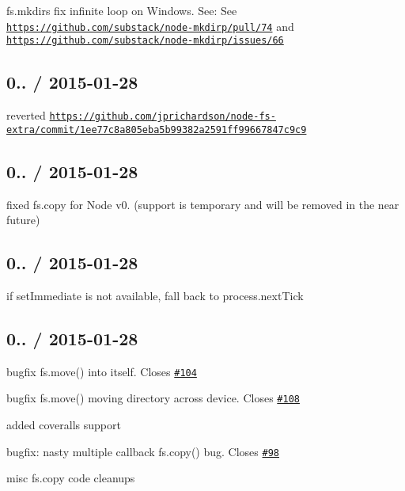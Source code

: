 \begin{DoxyItemize}
\item {\ttfamily fs.\+mkdirs} fix infinite loop on Windows. See\+: See \href{https://github.com/substack/node-mkdirp/pull/74}{\tt https\+://github.\+com/substack/node-\/mkdirp/pull/74} and \href{https://github.com/substack/node-mkdirp/issues/66}{\tt https\+://github.\+com/substack/node-\/mkdirp/issues/66}
\end{DoxyItemize}

\subsection*{0.. / 2015-\/01-\/28 }


\begin{DoxyItemize}
\item reverted \href{https://github.com/jprichardson/node-fs-extra/commit/1ee77c8a805eba5b99382a2591ff99667847c9c9}{\tt https\+://github.\+com/jprichardson/node-\/fs-\/extra/commit/1ee77c8a805eba5b99382a2591ff99667847c9c9}
\end{DoxyItemize}

\subsection*{0.. / 2015-\/01-\/28 }


\begin{DoxyItemize}
\item fixed {\ttfamily fs.\+copy} for Node v0. (support is temporary and will be removed in the near future)
\end{DoxyItemize}

\subsection*{0.. / 2015-\/01-\/28 }


\begin{DoxyItemize}
\item if {\ttfamily set\+Immediate} is not available, fall back to {\ttfamily process.\+next\+Tick}
\end{DoxyItemize}

\subsection*{0.. / 2015-\/01-\/28 }


\begin{DoxyItemize}
\item bugfix {\ttfamily fs.\+move()} into itself. Closes \href{https://github.com/jprichardson/node-fs-extra/issues/104}{\tt \#104}
\item bugfix {\ttfamily fs.\+move()} moving directory across device. Closes \href{https://github.com/jprichardson/node-fs-extra/issues/108}{\tt \#108}
\item added coveralls support
\item bugfix\+: nasty multiple callback {\ttfamily fs.\+copy()} bug. Closes \href{https://github.com/jprichardson/node-fs-extra/issues/98}{\tt \#98}
\item misc fs.\+copy code cleanups
\end{DoxyItemize}

